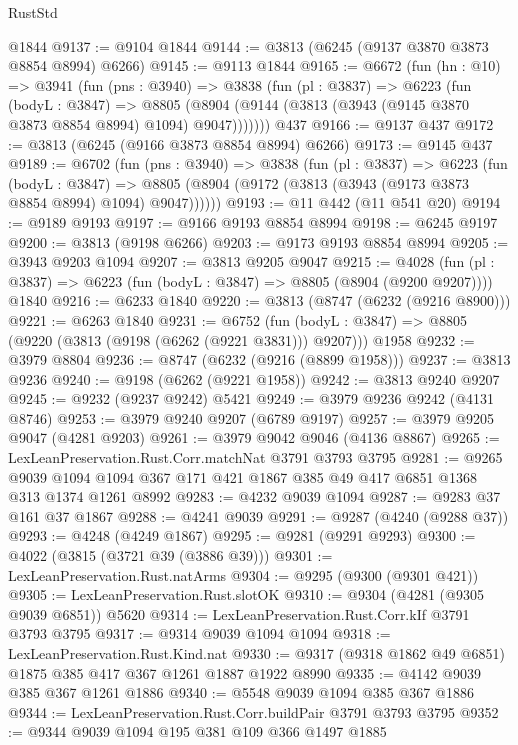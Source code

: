 \begin{lexlean}{RustStd}
\begin{coremodule}
    @1844
@9137 := @9104 @1844
@9144 := @3813 (@6245 (@9137 @3870 @3873 @8854 @8994) @6266)
@9145 := @9113 @1844
@9165 := @6672
    (fun (hn : @10) =>
    @3941
      (fun (pns : @3940) =>
      @3838
        (fun (pl : @3837) =>
        @6223
          (fun (bodyL : @3847) =>
          @8805 (@8904 (@9144 (@3813 (@3943 (@9145 @3870 @3873 @8854 @8994) @1094) @9047)))))))
    @437
@9166 := @9137 @437
@9172 := @3813 (@6245 (@9166 @3873 @8854 @8994) @6266)
@9173 := @9145 @437
@9189 := @6702
    (fun (pns : @3940) =>
    @3838
      (fun (pl : @3837) =>
      @6223
        (fun (bodyL : @3847) =>
        @8805 (@8904 (@9172 (@3813 (@3943 (@9173 @3873 @8854 @8994) @1094) @9047))))))
@9193 := @11 @442 (@11 @541 @20)
@9194 := @9189 @9193
@9197 := @9166 @9193 @8854 @8994
@9198 := @6245 @9197
@9200 := @3813 (@9198 @6266)
@9203 := @9173 @9193 @8854 @8994
@9205 := @3943 @9203 @1094
@9207 := @3813 @9205 @9047
@9215 := @4028
    (fun (pl : @3837) => @6223 (fun (bodyL : @3847) => @8805 (@8904 (@9200 @9207))))
    @1840
@9216 := @6233 @1840
@9220 := @3813 (@8747 (@6232 (@9216 @8900)))
@9221 := @6263 @1840
@9231 := @6752
    (fun (bodyL : @3847) => @8805 (@9220 (@3813 (@9198 (@6262 (@9221 @3831))) @9207)))
    @1958
@9232 := @3979 @8804
@9236 := @8747 (@6232 (@9216 (@8899 @1958)))
@9237 := @3813 @9236
@9240 := @9198 (@6262 (@9221 @1958))
@9242 := @3813 @9240 @9207
@9245 := @9232 (@9237 @9242) @5421
@9249 := @3979 @9236 @9242 (@4131 @8746)
@9253 := @3979 @9240 @9207 (@6789 @9197)
@9257 := @3979 @9205 @9047 (@4281 @9203)
@9261 := @3979 @9042 @9046 (@4136 @8867)
@9265 := LexLeanPreservation.Rust.Corr.matchNat @3791 @3793 @3795
@9281 := @9265
    @9039
    @1094
    @1094
    @367
    @171
    @421
    @1867
    @385
    @49
    @417
    @6851
    @1368
    @313
    @1374
    @1261
    @8992
@9283 := @4232 @9039 @1094
@9287 := @9283 @37 @161 @37 @1867
@9288 := @4241 @9039
@9291 := @9287 (@4240 (@9288 @37))
@9293 := @4248 (@4249 @1867)
@9295 := @9281 (@9291 @9293)
@9300 := @4022 (@3815 (@3721 @39 (@3886 @39)))
@9301 := LexLeanPreservation.Rust.natArms
@9304 := @9295 (@9300 (@9301 @421))
@9305 := LexLeanPreservation.Rust.slotOK
@9310 := @9304 (@4281 (@9305 @9039 @6851)) @5620
@9314 := LexLeanPreservation.Rust.Corr.kIf @3791 @3793 @3795
@9317 := @9314 @9039 @1094 @1094
@9318 := LexLeanPreservation.Rust.Kind.nat
@9330 := @9317 (@9318 @1862 @49 @6851) @1875 @385 @417 @367 @1261 @1887 @1922 @8990
@9335 := @4142 @9039 @385 @367 @1261 @1886
@9340 := @5548 @9039 @1094 @385 @367 @1886
@9344 := LexLeanPreservation.Rust.Corr.buildPair @3791 @3793 @3795
@9352 := @9344 @9039 @1094 @195 @381 @109 @366 @1497 @1885

\end{coremodule}
\end{lexlean}
